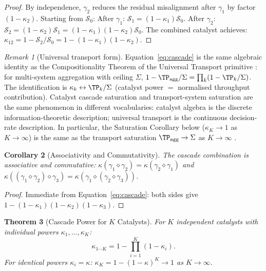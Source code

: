 \documentclass[twocolumn,10pt,a4paper]{article}
\theoremstyle{thmstyle}
\newtheorem{theorem}{Theorem}[section]
\newtheorem{corollary}[theorem]{Corollary}
\theoremstyle{definition}
\theoremstyle{remark}
\newtheorem{remark}[theorem]{Remark}
\newcommand{\catpow}{\kappa}
\begin{document}
\begin{proof}
By independence, $\gamma_2$ reduces the residual misalignment after $\gamma_1$
by factor $(1-\catpow_2)$. Starting from $\mathcal{S}_0$:
After $\gamma_1$: $\mathcal{S}_1 = (1-\catpow_1)\mathcal{S}_0$.
After $\gamma_2$: $\mathcal{S}_2 = (1-\catpow_2)\mathcal{S}_1
= (1-\catpow_1)(1-\catpow_2)\mathcal{S}_0$.
The combined catalyst achieves:
$\catpow_{12} = 1 - \mathcal{S}_2/\mathcal{S}_0
= 1 - (1-\catpow_1)(1-\catpow_2)$.
\end{proof}

\begin{remark}[Universal transport form]
Equation~\eqref{eq:cascade} is the same algebraic identity as the
Compositionality Theorem of the Universal Transport primitive
\citep{companion:transport}: for multi-system aggregation with ceiling $\Sigma$,
$1 - \TP_{\mathrm{agg}}/\Sigma = \prod_k(1 - \TP_k/\Sigma)$.
The identification is $\catpow_k \leftrightarrow \TP_k/\Sigma$
(catalyst power $=$ normalised throughput contribution).
Catalyst cascade saturation and transport-system saturation are the same
phenomenon in different vocabularies: catalyst algebra is the discrete
information-theoretic description; universal transport is the continuous
decision-rate description. In particular, the Saturation Corollary below
($\catpow_K \to 1$ as $K \to \infty$) is the same as the transport
saturation $\TP_{\mathrm{agg}} \to \Sigma$ as $K\to\infty$
\citep{companion:transport}.
\end{remark}

\begin{corollary}[Associativity and Commutativity]
\label{cor:assoc}
The cascade combination is associative and commutative:
$\catpow(\gamma_1\diamond\gamma_2) = \catpow(\gamma_2\diamond\gamma_1)$
and $\catpow((\gamma_1\diamond\gamma_2)\diamond\gamma_3)
= \catpow(\gamma_1\diamond(\gamma_2\diamond\gamma_3))$.
\end{corollary}

\begin{proof}
Immediate from Equation~\eqref{eq:cascade}: both sides give
$1 - (1-\catpow_1)(1-\catpow_2)(1-\catpow_3)$.
\end{proof}

\begin{theorem}[Cascade Power for $K$ Catalysts]
\label{thm:K_cascade}
For $K$ independent catalysts with individual powers $\catpow_1,\ldots,\catpow_K$:
\begin{equation}
\catpow_{1\cdots K} = 1 - \prod_{i=1}^K(1-\catpow_i).
\label{eq:K_cascade}
\end{equation}
For identical powers $\catpow_i = \catpow$:
$\catpow_K = 1 - (1-\catpow)^K \to 1$ as $K \to \infty$.
\end{theorem}
\end{document}
